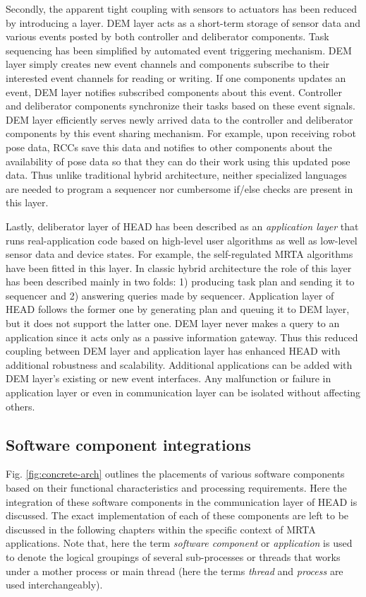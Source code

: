 Secondly, the apparent tight coupling with sensors to actuators has been reduced by introducing a  layer. DEM layer acts as a short-term storage of sensor data and various events posted by both controller and deliberator components. Task sequencing has been simplified by automated event triggering mechanism. DEM layer simply creates new event channels and components subscribe to their interested event channels for reading or writing. If one components updates an event, DEM layer notifies subscribed components about this event. Controller and deliberator components synchronize their tasks based on these event signals. DEM layer efficiently serves newly arrived data to the controller and deliberator components by this event sharing mechanism. For example, upon receiving robot pose data, RCCs save this data and notifies to other components about the availability of pose data so that they can do their work using this updated pose data. Thus unlike traditional hybrid architecture, neither specialized languages are needed to program a sequencer nor cumbersome if/else checks are present in this layer.

Lastly, deliberator layer of HEAD has been described as an {\em application layer} that runs real-application code based on high-level user algorithms as well as low-level sensor data and device states. For example, the self-regulated MRTA algorithms have been fitted in this layer. In classic hybrid architecture the role of this layer has been described mainly in two folds: 1) producing task plan and sending it to sequencer and 2) answering queries made by sequencer. Application layer of HEAD follows the former one by generating plan and queuing it to DEM layer, but it does not support the latter one. DEM layer never makes a query to an application since it acts only as a passive information gateway. Thus this reduced coupling between DEM layer and application layer has enhanced HEAD with additional robustness and scalability. Additional applications can be added with DEM layer's existing or new event interfaces. Any malfunction or failure in application layer or even in communication layer can be isolated without affecting others. 
\subsection{Software component integrations}
\label{expt-tools:arch:integration}
Fig. \ref{fig:concrete-arch} outlines the placements of various software components based on their functional characteristics and processing requirements. Here the integration of these software components in the communication layer of HEAD is discussed. The exact implementation of each of these components are left to be discussed in the following chapters within the specific context of MRTA applications. Note that, here  the term {\em software component} or {\em application} is used to denote the logical groupings of several sub-processes or threads that works under a mother process or main thread (here the terms \textit{thread} and \textit{process} are used interchangeably).

